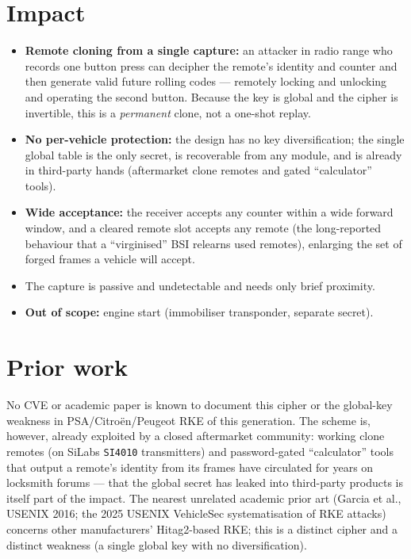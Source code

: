 \documentclass[11pt,a4paper]{article}
\newcommand{\hex}[1]{\texttt{#1}}
\begin{document}
\section{Impact}
\begin{itemize}
\item \textbf{Remote cloning from a single capture:} an attacker in radio range who records one button press can decipher the remote's identity and counter and then generate valid future rolling codes --- remotely locking and unlocking and operating the second button. Because the key is global and the cipher is invertible, this is a \emph{permanent} clone, not a one-shot replay.
\item \textbf{No per-vehicle protection:} the design has no key diversification; the single global table is the only secret, is recoverable from any module, and is already in third-party hands (aftermarket clone remotes and gated ``calculator'' tools).
\item \textbf{Wide acceptance:} the receiver accepts any counter within a wide forward window, and a cleared remote slot accepts any remote (the long-reported behaviour that a ``virginised'' BSI relearns used remotes), enlarging the set of forged frames a vehicle will accept.
\item The capture is passive and undetectable and needs only brief proximity.
\item \textbf{Out of scope:} engine start (immobiliser transponder, separate secret).
\end{itemize}

\section{Prior work}
No CVE or academic paper is known to document this cipher or the global-key weakness in PSA/Citro\"en/Peugeot RKE of this generation. The scheme is, however, already exploited by a closed aftermarket community: working clone remotes (on SiLabs \hex{SI4010} transmitters) and password-gated ``calculator'' tools that output a remote's identity from its frames have circulated for years on locksmith forums --- that the global secret has leaked into third-party products is itself part of the impact. The nearest unrelated academic prior art (Garcia et al., USENIX 2016; the 2025 USENIX VehicleSec systematisation of RKE attacks) concerns other manufacturers' Hitag2-based RKE; this is a distinct cipher and a distinct weakness (a single global key with no diversification).
\end{document}
